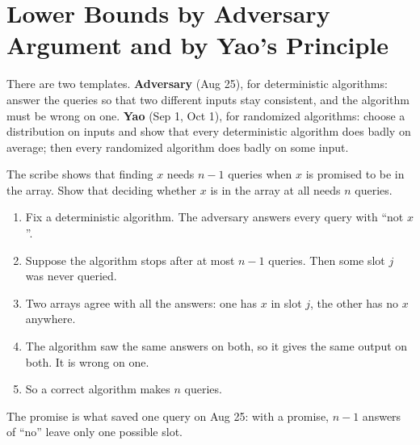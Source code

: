 \section{Lower Bounds by Adversary Argument and by Yao's Principle}\label{sec:lower}

There are two templates. \textbf{Adversary} (Aug 25), for deterministic algorithms: answer the
queries so that two different inputs stay consistent, and the algorithm must be wrong on one.
\textbf{Yao} (Sep 1, Oct 1), for randomized algorithms: choose a distribution on inputs and show
that every deterministic algorithm does badly on average; then every randomized algorithm does
badly on some input.

\begin{exercisebox}
\begin{pproblem}\label{pp:membership}
    The scribe shows that finding $x$ needs $n - 1$ queries when $x$ is promised to be in the array.
    Show that deciding whether $x$ is in the array at all needs $n$ queries.
\end{pproblem}
\tcblower
\begin{wsolution}
    \leavevmode
    \begin{enumerate}
        \item Fix a deterministic algorithm. The adversary answers every query with ``not $x$''.
        \item Suppose the algorithm stops after at most $n - 1$ queries. Then some slot $j$ was never
              queried.
        \item Two arrays agree with all the answers: one has $x$ in slot $j$, the other has no $x$
              anywhere.
        \item The algorithm saw the same answers on both, so it gives the same output on both. It is
              wrong on one.
        \item So a correct algorithm makes $n$ queries.
    \end{enumerate}
    The promise is what saved one query on Aug 25: with a promise, $n - 1$ answers of ``no'' leave
    only one possible slot.
\end{wsolution}
\end{exercisebox}

